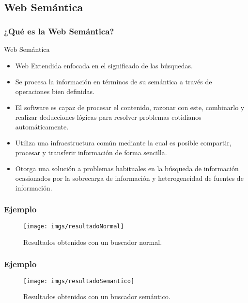 \documentclass{beamer}
\begin{document}
\subsection{Web Semántica}
\begin{frame}
\frametitle{¿Qué es la Web Semántica?} 
\begin{block}{Web Semántica}
\begin{itemize}
\item<1-> Web Extendida enfocada en el significado de las búsquedas.
\item<2-> Se procesa la información en términos de su semántica a través de operaciones bien definidas.
\item<3-> El software es capaz de procesar el contenido, razonar con este, combinarlo y realizar deducciones lógicas para resolver problemas cotidianos automáticamente.
\item<4-> Utiliza una infraestructura común mediante la cual es posible compartir, procesar y transferir información de forma sencilla.
\item<5-> Otorga una solución a problemas habituales en la búsqueda de información ocasionados por la sobrecarga de información y heterogeneidad de fuentes de información.
\end{itemize}
\end{block}
\end{frame}
\begin{frame}
\frametitle{Ejemplo} 
\begin{figure}[H] %
\begin{center}
\texttt{[image: imgs/resultadoNormal]}
\caption{Resultados obtenidos con un buscador normal.}
\end{center}
\end{figure}
\end{frame}
\begin{frame}
\frametitle{Ejemplo} 
\begin{figure}[H] %
\begin{center}
\texttt{[image: imgs/resultadoSemantico]}
\caption{Resultados obtenidos con un buscador semántico.}
\end{center}
\end{figure}
\end{frame}
\end{document}
